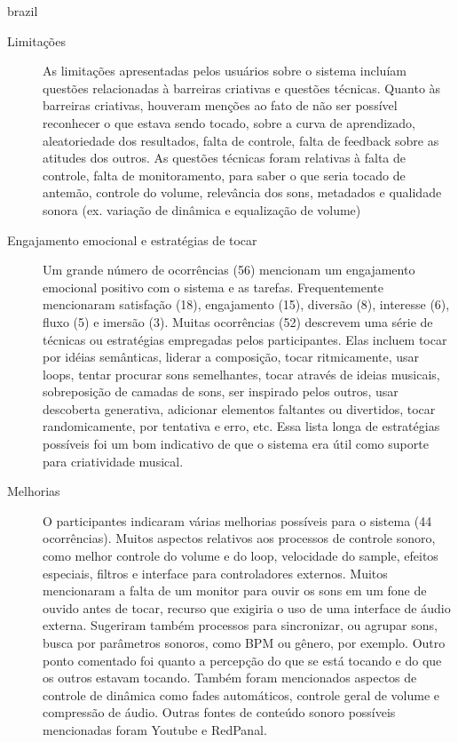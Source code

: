 \begin{otherlanguage*}{brazil}
\begin{description}
\item[Limitações] As limitações apresentadas pelos usuários sobre o sistema incluíam questões relacionadas à barreiras criativas e questões técnicas. Quanto às barreiras criativas, houveram menções ao fato de não ser possível reconhecer o que estava sendo tocado, sobre a curva de aprendizado, aleatoriedade dos resultados, falta de controle, falta de feedback sobre as atitudes dos outros. As questões técnicas foram relativas à falta de controle, falta de monitoramento, para saber o que seria tocado de antemão, controle do volume, relevância dos sons, metadados e qualidade sonora (ex. variação de dinâmica e equalização de volume)

\item[Engajamento emocional e estratégias de tocar] Um grande número de ocorrências (56) mencionam um engajamento emocional positivo com o sistema e as tarefas. Frequentemente mencionaram satisfação (18), engajamento (15), diversão (8), interesse (6), fluxo (5) e imersão (3). Muitas ocorrências (52) descrevem uma série de técnicas ou estratégias empregadas pelos participantes. Elas incluem tocar por idéias semânticas, liderar a composição, tocar ritmicamente, usar loops, tentar procurar sons semelhantes, tocar através de ideias musicais, sobreposição de camadas de sons, ser inspirado pelos outros, usar descoberta generativa, adicionar elementos faltantes ou divertidos, tocar randomicamente, por tentativa e erro, etc. Essa lista longa de estratégias possíveis foi um bom indicativo de que o sistema era útil como suporte para criatividade musical. 

\item[Melhorias] O participantes indicaram várias melhorias possíveis para o sistema (44 ocorrências). Muitos aspectos relativos aos processos de controle sonoro, como melhor controle do volume e do loop, velocidade do sample, efeitos especiais, filtros e interface para controladores externos. Muitos mencionaram a falta de um monitor para ouvir os sons em um fone de ouvido antes de tocar, recurso que exigiria o uso de uma interface de áudio externa. Sugeriram também processos para sincronizar, ou agrupar sons, busca por parâmetros sonoros, como BPM ou gênero, por exemplo. Outro ponto comentado foi quanto a percepção do que se está tocando e do que os outros estavam tocando. Também foram mencionados aspectos de controle de dinâmica como fades automáticos, controle geral de volume e compressão de áudio. Outras fontes de conteúdo sonoro possíveis mencionadas foram Youtube e RedPanal.


\end{description}
\end{otherlanguage*}
